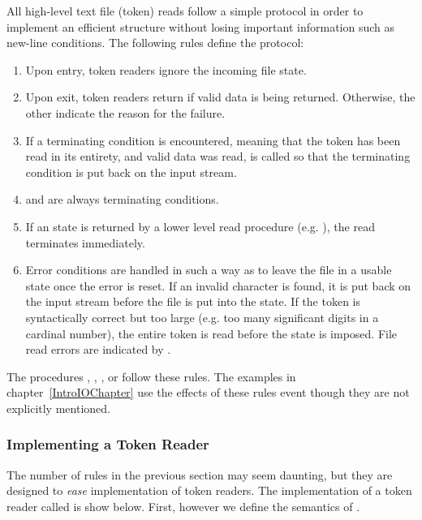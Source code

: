 All high-level text file (token) reads follow a simple protocol in order to
implement an efficient structure without losing important information
such as new-line conditions.  The following rules define the protocol:
\begin{enumerate}
\item
    Upon entry, token readers ignore the incoming file state.
\item
    Upon exit, token readers return  if valid data
    is being returned.   Otherwise, the other 
    indicate the reason for the failure.
\item
    If a terminating condition is encountered, meaning that the token
    has been read in its entirety, and valid data was 
    read,  is called so that the terminating condition
    is put back on the input stream.
\item
     and  are always terminating
    conditions.
\item
    If an  state is returned by a lower
    level read procedure (e.g. ), the read
    terminates immediately.
\item
    Error conditions are handled in such a way as to leave the file
    in a usable state once the error is reset.
    If an invalid character is found, it is 
    put back on the input stream before the file is put into 
    the 
    state.  If the token is syntactically correct but too large 
    (e.g. too many significant digits in a cardinal number), 
    the entire token is read before the  state is imposed.
    File read errors are indicated by .
\end{enumerate}

The procedures , ,
, or  follow these
rules.  The examples in chapter~\ref{IntroIOChapter} use
the effects of these rules event though they are not explicitly
mentioned.

\subsubsection{Implementing a Token Reader}
\label{TokenReader1}

The number of rules in the previous section may seem daunting, but
they are designed to {\em ease} implementation of token readers.
The implementation of a token reader called  is
show below.  First, however we define the semantics of .

